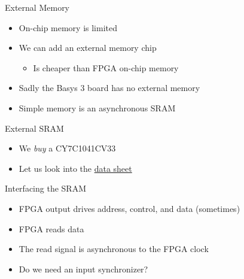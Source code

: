 \begin{frame}[fragile]{External Memory}
\begin{itemize}
\item On-chip memory is limited
\item We can add an external memory chip
\begin{itemize}
\item Is cheaper than FPGA on-chip memory
\end{itemize}
\item Sadly the Basys 3 board has no external memory
\item Simple memory is an asynchronous SRAM
\end{itemize}
\end{frame}

\begin{frame}[fragile]{External SRAM}
\begin{itemize}
\item We \emph{buy} a CY7C1041CV33
\item Let us look into the \href{https://www.infineon.com/dgdl/Infineon-CY7C1041CV33_Automotive_4-Mbit_(256_K_16)_Static_RAM_Datasheet-AdditionalTechnicalInformation-v04_00-EN.pdf?fileId=8ac78c8c7d0d8da4017d0ecb80544500}{data sheet}
\end{itemize}
\end{frame}

\begin{frame}[fragile]{Interfacing the SRAM}
\begin{itemize}
\item FPGA output drives address, control, and data (sometimes)
\item FPGA reads data
\item The read signal is asynchronous to the FPGA clock
\item Do we need an input synchronizer?
\end{itemize}
\end{frame}

